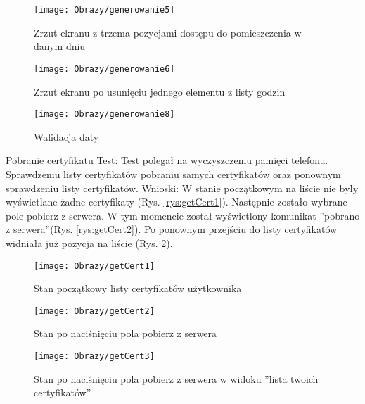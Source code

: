 \documentclass[twoside,10pt]{article}
\begin{document}
\begin{enumerate*}
\begin{figure}
\centering
\begin{minipage}{0.2\textwidth}
\vspace{0.4cm}
\texttt{[image: Obrazy/generowanie5]}
\caption{Zrzut ekranu z trzema pozycjami dostępu do pomieszczenia w danym dniu }
\label{rys:generowanie5}
\end{minipage}
\hspace{0.05\textwidth}
\begin{minipage}{0.2\textwidth}
\texttt{[image: Obrazy/generowanie6]}
\caption{Zrzut ekranu po usunięciu jednego elementu z listy godzin}
\label{rys:generowanie6}
\end{minipage}
\hspace{0.05\textwidth}
\begin{minipage}{0.2\textwidth}
\vspace{-0.5cm}
\texttt{[image: Obrazy/generowanie8]}
\caption{Walidacja daty}
\label{rys:generowanie7}
\end{minipage}
\end{figure}

\newpage
\item  Pobranie certyfikatu\newline
Test: Test polegał na wyczyszczeniu pamięci telefonu. Sprawdzeniu listy certyfikatów pobraniu samych certyfikatów oraz ponownym sprawdzeniu listy certyfikatów.\newline
Wnioski: W stanie początkowym na liście nie były wyświetlane żadne certyfikaty (Rys. \ref{rys:getCert1}). Następnie zostało wybrane pole pobierz z serwera. W tym momencie został wyświetlony komunikat ''pobrano z serwera''(Rys. \ref{rys:getCert2}). Po ponownym przejściu do listy certyfikatów widniała już pozycja na liście (Rys. \ref{rys:getCert3}).
\begin{figure}[ht!]
\centering
\begin{minipage}{0.2\textwidth}
\texttt{[image: Obrazy/getCert1]}
\caption{Stan początkowy listy certyfikatów użytkownika }
\label{rys:getCert1}
\end{minipage}
\hspace{0.05\textwidth}
\begin{minipage}{0.2\textwidth}
\texttt{[image: Obrazy/getCert2]}
\caption{Stan po naciśnięciu pola pobierz z serwera }
\label{rys:getCert2}
\end{minipage}
\hspace{0.05\textwidth}
\begin{minipage}{0.3\textwidth}
\texttt{[image: Obrazy/getCert3]}
\caption{Stan po naciśnięciu pola pobierz z serwera w widoku ''lista twoich certyfikatów''}
\label{rys:getCert3}
\end{minipage}
\end{figure}


\end{enumerate*}
\end{document}
